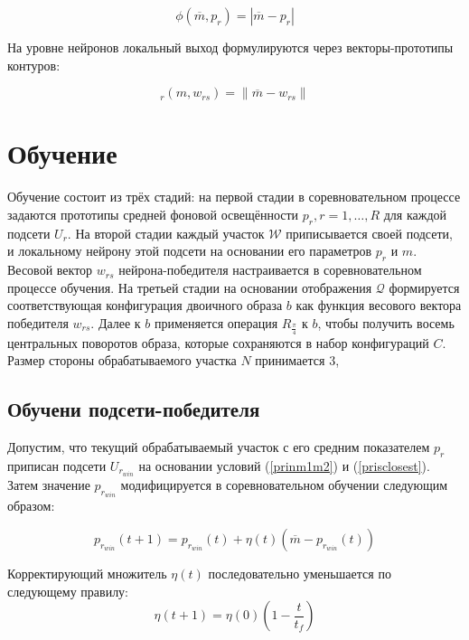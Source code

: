 \documentclass[a4paper,12pt]{report}
\begin{document}
\begin{equation}
\phi (\overline{m},p_r)=|\overline{m} - p_r|
\end{equation}

На уровне нейронов локальный выход формулируются через векторы-прототипы контуров: 

\begin{equation}
_r(m,w_{rs})=\|\overline{m}-w_{rs}\|
\end{equation}

\section{Обучение} 

Обучение состоит из трёх стадий: на первой стадии в соревновательном процессе задаются прототипы средней фоновой освещённости $p_r,r=1,\dots, R$ для каждой подсети $U_r$. На второй стадии каждый участок $\mathcal{W}$ приписывается своей подсети, и локальному нейрону этой подсети на основании его параметров $p_r$ и $m$. Весовой вектор $w_{rs}$ нейрона-победителя настраивается в соревновательном процессе обучения. На третьей стадии на основании отображения $\mathcal{Q}$ формируется соответствующая конфигурация двоичного образа $b$ как функция весового вектора победителя $w_{rs}$. Далее к $b$ применяется операция $R_{\frac{\pi}{4}}$ к $b$, чтобы получить восемь центральных поворотов образа, которые сохраняются в набор конфигураций $C$. Размер стороны обрабатываемого участка $N$ принимается $3$,
 
\subsection{Обучени подсети-победителя}
 
Допустим, что текущий обрабатываемый участок с его средним показателем $p_r$ приписан подсети $U_{r_{win}}$ на основании условий (\ref{prinm1m2}) и (\ref{prisclosest}). Затем значение $p_{r_{win}}$ модифицируется в соревновательном обучении следующим образом:

\begin{equation}
p_{r_{win}}(t+1)=p_{r_{win}}(t)+\eta(t)(\overline{m}-p_{r_{win}}(t))
\label{levelcorrection}
\end{equation}

Корректирующий множитель $\eta(t)$ последовательно уменьшается по следующему правилу:
\begin{equation}
\eta(t+1)=\eta(0)\left(1-\frac{t}{t_f}\right)
\label{corrector}
\end{equation}
 
\end{document}
